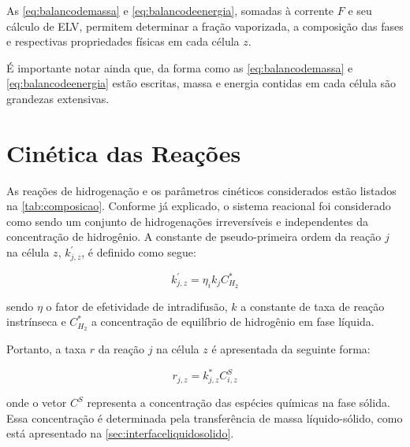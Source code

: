 
As \autoref{eq:balancodemassa} e \autoref{eq:balancodeenergia}, somadas à
corrente $F$ e seu cálculo de ELV, permitem determinar a fração vaporizada,
a composição das fases e respectivas propriedades físicas em cada célula $z$.

É importante notar ainda que, da forma como as \autoref{eq:balancodemassa} e
\autoref{eq:balancodeenergia} estão escritas, massa e energia contidas em cada
célula são grandezas extensivas. 

\section{Cinética das Reações} \label{sec:cineticadasreacoes}

As reações de hidrogenação e os parâmetros cinéticos considerados estão
listados na \autoref{tab:composicao}. Conforme já explicado, o sistema reacional
foi considerado como sendo um conjunto de hidrogenações irreversíveis e
independentes da concentração de hidrogênio. A constante de pseudo-primeira
ordem da reação $j$ na célula $z$, $k^{'}_{j,z}$, é definido como segue:

\begin{equation}
k^{'}_{j,z} = \eta_ik_jC^{*}_{H_2}
\label{eq:constantepseudoprimeiraordem}
\end{equation}

sendo $\eta$ o fator de efetividade de intradifusão, $k$ a
constante de taxa de reação instrínseca e $C^{*}_{H_2}$ a concentração de
equilíbrio de hidrogênio em fase líquida.


Portanto, a taxa $r$ da reação $j$ na célula $z$ é apresentada da seguinte
forma:

\begin{equation}
r_{j,z} = k^{*}_{j,z}C^{S}_{i,z}
\label{eq:taxareacao}
\end{equation}

onde o vetor $C^{S}$ representa a concentração das espécies químicas na fase
sólida. Essa concentração é determinada pela transferência de massa
líquido-sólido, como está apresentado na \autoref{sec:interfaceliquidosolido}.

